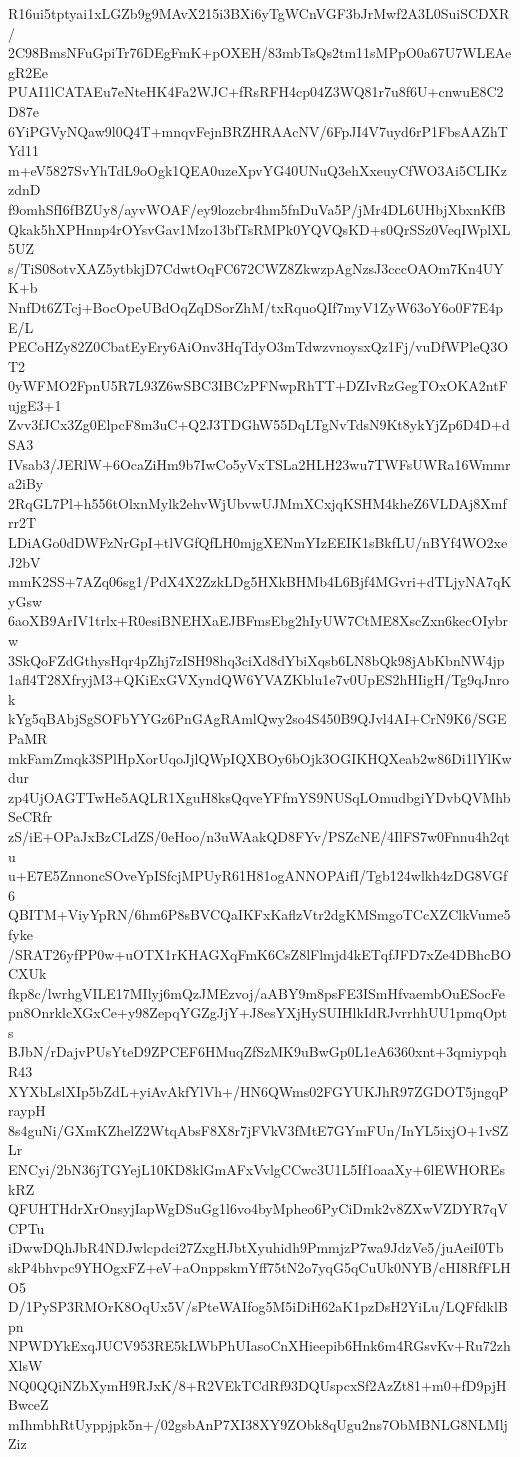 R16ui5tptyai1xLGZb9g9MAvX215i3BXi6yTgWCnVGF3bJrMwf2A3L0SuiSCDXR/
2C98BmsNFuGpiTr76DEgFmK+pOXEH/83mbTsQs2tm11sMPpO0a67U7WLEAegR2Ee
PUAI1lCATAEu7eNteHK4Fa2WJC+fRsRFH4cp04Z3WQ81r7u8f6U+cnwuE8C2D87e
6YiPGVyNQaw9l0Q4T+mnqvFejnBRZHRAAcNV/6FpJI4V7uyd6rP1FbsAAZhTYd11
m+eV5827SvYhTdL9oOgk1QEA0uzeXpvYG40UNuQ3ehXxeuyCfWO3Ai5CLIKzzdnD
f9omhSfI6fBZUy8/ayvWOAF/ey9lozcbr4hm5fnDuVa5P/jMr4DL6UHbjXbxnKfB
Qkak5hXPHnnp4rOYsvGav1Mzo13bfTsRMPk0YQVQsKD+s0QrSSz0VeqIWplXL5UZ
s/TiS08otvXAZ5ytbkjD7CdwtOqFC672CWZ8ZkwzpAgNzsJ3cccOAOm7Kn4UYK+b
NnfDt6ZTcj+BocOpeUBdOqZqDSorZhM/txRquoQIf7myV1ZyW63oY6o0F7E4pE/L
PECoHZy82Z0CbatEyEry6AiOnv3HqTdyO3mTdwzvnoysxQz1Fj/vuDfWPleQ3OT2
0yWFMO2FpnU5R7L93Z6wSBC3IBCzPFNwpRhTT+DZIvRzGegTOxOKA2ntFujgE3+1
Zvv3fJCx3Zg0ElpcF8m3uC+Q2J3TDGhW55DqLTgNvTdsN9Kt8ykYjZp6D4D+dSA3
IVsab3/JERlW+6OcaZiHm9b7IwCo5yVxTSLa2HLH23wu7TWFsUWRa16Wmmra2iBy
2RqGL7Pl+h556tOlxnMylk2ehvWjUbvwUJMmXCxjqKSHM4kheZ6VLDAj8Xmfrr2T
LDiAGo0dDWFzNrGpI+tlVGfQfLH0mjgXENmYIzEEIK1sBkfLU/nBYf4WO2xeJ2bV
mmK2SS+7AZq06sg1/PdX4X2ZzkLDg5HXkBHMb4L6Bjf4MGvri+dTLjyNA7qKyGsw
6aoXB9ArIV1trlx+R0esiBNEHXaEJBFmsEbg2hIyUW7CtME8XscZxn6kecOIybrw
3SkQoFZdGthysHqr4pZhj7zISH98hq3ciXd8dYbiXqsb6LN8bQk98jAbKbnNW4jp
1afl4T28XfryjM3+QKiExGVXyndQW6YVAZKblu1e7v0UpES2hHIigH/Tg9qJnrok
kYg5qBAbjSgSOFbYYGz6PnGAgRAmlQwy2so4S450B9QJvl4AI+CrN9K6/SGEPaMR
mkFamZmqk3SPlHpXorUqoJjlQWpIQXBOy6bOjk3OGIKHQXeab2w86Di1lYlKwdur
zp4UjOAGTTwHe5AQLR1XguH8ksQqveYFfmYS9NUSqLOmudbgiYDvbQVMhbSeCRfr
zS/iE+OPaJxBzCLdZS/0eHoo/n3uWAakQD8FYv/PSZcNE/4IlFS7w0Fnnu4h2qtu
u+E7E5ZnnoncSOveYpISfcjMPUyR61H81ogANNOPAifI/Tgb124wlkh4zDG8VGf6
QBITM+ViyYpRN/6hm6P8sBVCQaIKFxKaflzVtr2dgKMSmgoTCcXZClkVume5fyke
/SRAT26yfPP0w+uOTX1rKHAGXqFmK6CsZ8lFlmjd4kETqfJFD7xZe4DBhcBOCXUk
fkp8c/lwrhgVILE17MIlyj6mQzJMEzvoj/aABY9m8psFE3ISmHfvaembOuESocFe
pn8OnrklcXGxCe+y98ZepqYGZgJjY+J8esYXjHySUIHlkIdRJvrrhhUU1pmqOpts
BJbN/rDajvPUsYteD9ZPCEF6HMuqZfSzMK9uBwGp0L1eA6360xnt+3qmiypqhR43
XYXbLslXIp5bZdL+yiAvAkfYlVh+/HN6QWms02FGYUKJhR97ZGDOT5jngqPraypH
8s4guNi/GXmKZhelZ2WtqAbsF8X8r7jFVkV3fMtE7GYmFUn/InYL5ixjO+1vSZLr
ENCyi/2bN36jTGYejL10KD8klGmAFxVvlgCCwc3U1L5If1oaaXy+6lEWHOREskRZ
QFUHTHdrXrOnsyjIapWgDSuGg1l6vo4byMpheo6PyCiDmk2v8ZXwVZDYR7qVCPTu
iDwwDQhJbR4NDJwlcpdci27ZxgHJbtXyuhidh9PmmjzP7wa9JdzVe5/juAeiI0Tb
skP4bhvpc9YHOgxFZ+eV+aOnppskmYff75tN2o7yqG5qCuUk0NYB/cHI8RfFLHO5
D/1PySP3RMOrK8OqUx5V/sPteWAIfog5M5iDiH62aK1pzDsH2YiLu/LQFfdklBpn
NPWDYkExqJUCV953RE5kLWbPhUIasoCnXHieepib6Hnk6m4RGsvKv+Ru72zhXlsW
NQ0QQiNZbXymH9RJxK/8+R2VEkTCdRf93DQUspcxSf2AzZt81+m0+fD9pjHBwceZ
mIhmbhRtUyppjpk5n+/02gsbAnP7XI38XY9ZObk8qUgu2ns7ObMBNLG8NLMljZiz
